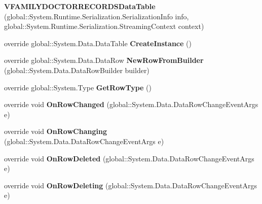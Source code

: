 \begin{CompactItemize}
\item 
\textbf{VFAMILYDOCTORRECORDSDataTable} (global::System.Runtime.Serialization.SerializationInfo info, global::System.Runtime.Serialization.StreamingContext context)\label{class_automatic_medical_system_1_1_data_set1_1_1_v_f_a_m_i_l_y_d_o_c_t_o_r_r_e_c_o_r_d_s_data_table_d819103bae426fc05d2f0cd8265771f1}

\item 
override global::System.Data.DataTable \textbf{CreateInstance} ()\label{class_automatic_medical_system_1_1_data_set1_1_1_v_f_a_m_i_l_y_d_o_c_t_o_r_r_e_c_o_r_d_s_data_table_98ce65efeb4bfd16d9c60a5e90994805}

\item 
override global::System.Data.DataRow \textbf{NewRowFromBuilder} (global::System.Data.DataRowBuilder builder)\label{class_automatic_medical_system_1_1_data_set1_1_1_v_f_a_m_i_l_y_d_o_c_t_o_r_r_e_c_o_r_d_s_data_table_c2b36fba593232cb55f3d63d0c58055f}

\item 
override global::System.Type \textbf{GetRowType} ()\label{class_automatic_medical_system_1_1_data_set1_1_1_v_f_a_m_i_l_y_d_o_c_t_o_r_r_e_c_o_r_d_s_data_table_a6332063acd7ba0bebe8526e82f66ba8}

\item 
override void \textbf{OnRowChanged} (global::System.Data.DataRowChangeEventArgs e)\label{class_automatic_medical_system_1_1_data_set1_1_1_v_f_a_m_i_l_y_d_o_c_t_o_r_r_e_c_o_r_d_s_data_table_2651f5367f794e6505d7534a974c62e1}

\item 
override void \textbf{OnRowChanging} (global::System.Data.DataRowChangeEventArgs e)\label{class_automatic_medical_system_1_1_data_set1_1_1_v_f_a_m_i_l_y_d_o_c_t_o_r_r_e_c_o_r_d_s_data_table_3ef909b8e4244f593b6754c154101096}

\item 
override void \textbf{OnRowDeleted} (global::System.Data.DataRowChangeEventArgs e)\label{class_automatic_medical_system_1_1_data_set1_1_1_v_f_a_m_i_l_y_d_o_c_t_o_r_r_e_c_o_r_d_s_data_table_291eba19347e4809ba20f271320b87c3}

\item 
override void \textbf{OnRowDeleting} (global::System.Data.DataRowChangeEventArgs e)\label{class_automatic_medical_system_1_1_data_set1_1_1_v_f_a_m_i_l_y_d_o_c_t_o_r_r_e_c_o_r_d_s_data_table_c2ab956719cb0798e4f399d6ffd7965b}

\end{CompactItemize}
